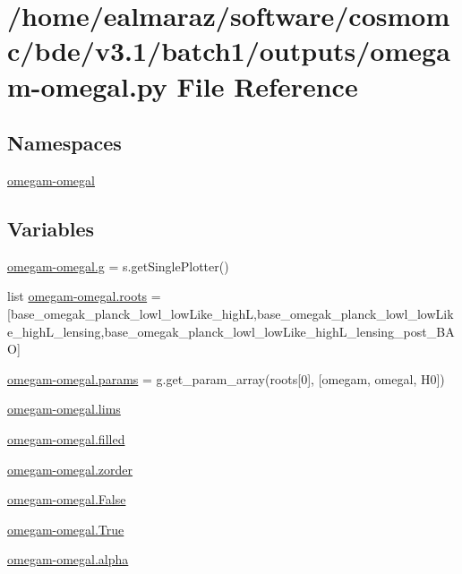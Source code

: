 \hypertarget{batch1_2outputs_2omegam-omegal_8py}{}\section{/home/ealmaraz/software/cosmomc/bde/v3.1/batch1/outputs/omegam-\/omegal.py File Reference}
\label{batch1_2outputs_2omegam-omegal_8py}
\subsection*{Namespaces}
\begin{DoxyCompactItemize}
\item 
 \mbox{\hyperlink{namespaceomegam-omegal}{omegam-\/omegal}}
\end{DoxyCompactItemize}
\subsection*{Variables}
\begin{DoxyCompactItemize}
\item 
\mbox{\hyperlink{namespaceomegam-omegal_a4054f790069e2d1ffd50aeb2578d3fcc}{omegam-\/omegal.\+g}} = s.\+get\+Single\+Plotter()
\item 
list \mbox{\hyperlink{namespaceomegam-omegal_a4c44907be0efd6e53ade38200d4441eb}{omegam-\/omegal.\+roots}} = \mbox{[}\textquotesingle{}base\+\_\+omegak\+\_\+planck\+\_\+lowl\+\_\+low\+Like\+\_\+highL\textquotesingle{},\textquotesingle{}base\+\_\+omegak\+\_\+planck\+\_\+lowl\+\_\+low\+Like\+\_\+high\+L\+\_\+lensing\textquotesingle{},\textquotesingle{}base\+\_\+omegak\+\_\+planck\+\_\+lowl\+\_\+low\+Like\+\_\+high\+L\+\_\+lensing\+\_\+post\+\_\+\+B\+AO\textquotesingle{}\mbox{]}
\item 
\mbox{\hyperlink{namespaceomegam-omegal_ab7ba8589a0821c23569cc7a92c334bb3}{omegam-\/omegal.\+params}} = g.\+get\+\_\+param\+\_\+array(roots\mbox{[}0\mbox{]}, \mbox{[}\textquotesingle{}omegam\textquotesingle{}, \textquotesingle{}omegal\textquotesingle{}, \textquotesingle{}H0\textquotesingle{}\mbox{]})
\item 
\mbox{\hyperlink{namespaceomegam-omegal_a95c2fb2d34f5ca5534b06c1360103b1e}{omegam-\/omegal.\+lims}}
\item 
\mbox{\hyperlink{namespaceomegam-omegal_a05373ed528194190a2a89b16b7cb1a3a}{omegam-\/omegal.\+filled}}
\item 
\mbox{\hyperlink{namespaceomegam-omegal_a16851c3c3b788cabc69f3da394ecd0e8}{omegam-\/omegal.\+zorder}}
\item 
\mbox{\hyperlink{namespaceomegam-omegal_a14f631ac642d366aa5e0d65d1e670c45}{omegam-\/omegal.\+False}}
\item 
\mbox{\hyperlink{namespaceomegam-omegal_acd24ecc78d0dddacbed664144f09801d}{omegam-\/omegal.\+True}}
\item 
\mbox{\hyperlink{namespaceomegam-omegal_a7638a38c1eb72d59a359961b305889d8}{omegam-\/omegal.\+alpha}}
\end{DoxyCompactItemize}
